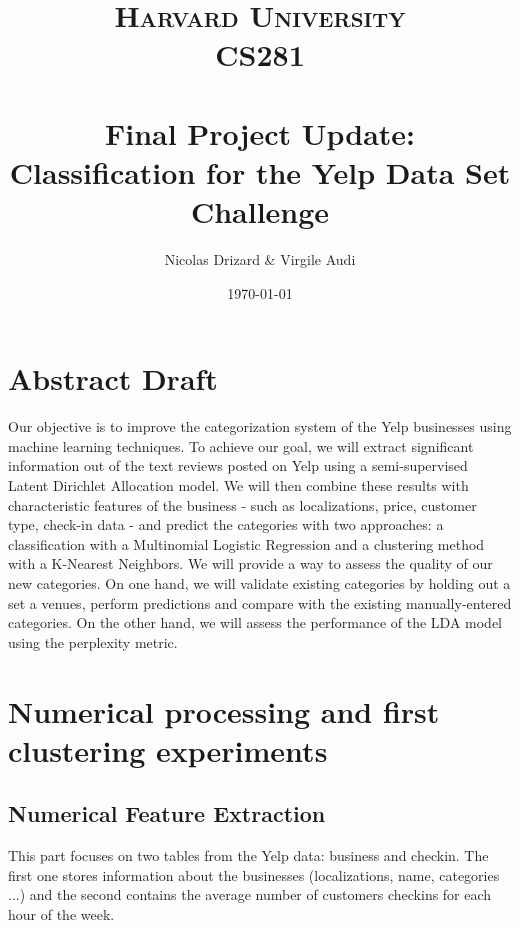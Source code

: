 \documentclass[paper=a4, fontsize=11pt]{scrartcl} %
\title{	
\normalfont \normalsize 
\textsc{Harvard University} \\[25pt]
\textsc{CS281} \\[25pt]
\horrule{0.5pt} \\[0.1cm] 
\huge Final Project Update: \\
\huge Classification for the Yelp Data Set Challenge
\horrule{2pt} \\[0.5cm]
}
\author{Nicolas Drizard \& Virgile Audi}
\date{\normalsize\today}
\numberwithin{equation}{section}
\numberwithin{figure}{section}
\numberwithin{table}{section}
\begin{document}
\maketitle

\section{Abstract Draft}

Our objective is to improve the categorization system of the Yelp businesses using machine learning techniques. To achieve our goal, we will extract significant information out of the text reviews posted on Yelp using a semi-supervised Latent Dirichlet Allocation model. We will then combine these results with characteristic features of the business - such as localizations, price, customer type, check-in data - and predict the categories with two approaches: a classification with a Multinomial Logistic Regression and a clustering method with a K-Nearest Neighbors. We will provide a way to assess the quality of our new categories. On one hand, we will validate existing categories by holding out a set a venues, perform predictions and compare with the existing manually-entered categories. On the other hand, we will assess the performance of the LDA model using the perplexity metric.

\section{Numerical processing and first clustering experiments}

\subsection{Numerical Feature Extraction}

This part focuses on two tables from the Yelp data: business and checkin. The first one stores information about the businesses (localizations, name, categories ...) and the second contains the average number of customers checkins for each hour of the week.\\
\end{document}
